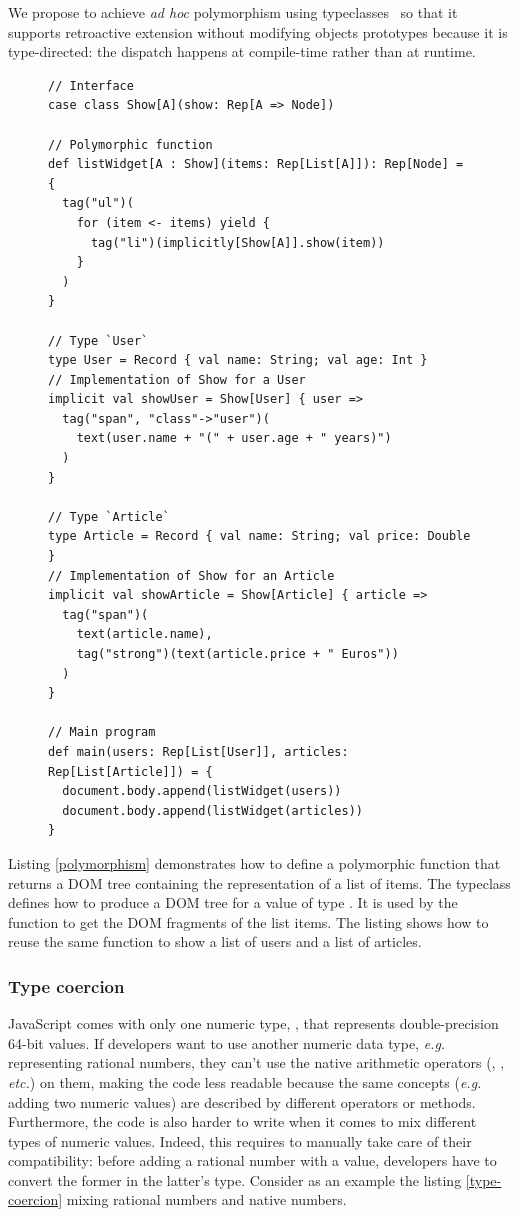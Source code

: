 \documentclass[american,english,runningheads]{llncs}
\newcommand{\eg}{\emph{e.g.}}
\newcommand{\etc}{\emph{etc.}}
\begin{document}
We propose to achieve \emph{ad hoc} polymorphism using
typeclasses~\cite{Wadler89_AdhocPolymorphism,Odersky06_Typeclasses,Oliveira10_Typeclasses} so that it supports
retroactive extension without modifying objects prototypes because it is type-directed: the dispatch happens at
compile-time rather than at runtime.

\begin{figure}
\begin{lstlisting}[label=polymorphism,caption=Ad hoc polymorphism using typeclasses]
// Interface
case class Show[A](show: Rep[A => Node])

// Polymorphic function
def listWidget[A : Show](items: Rep[List[A]]): Rep[Node] = {
  tag("ul")(
    for (item <- items) yield {
      tag("li")(implicitly[Show[A]].show(item))
    }
  )
}

// Type `User`
type User = Record { val name: String; val age: Int }
// Implementation of Show for a User
implicit val showUser = Show[User] { user =>
  tag("span", "class"->"user")(
    text(user.name + "(" + user.age + " years)")
  )
}

// Type `Article`
type Article = Record { val name: String; val price: Double }
// Implementation of Show for an Article
implicit val showArticle = Show[Article] { article =>
  tag("span")(
    text(article.name),
    tag("strong")(text(article.price + " Euros"))
  )
}

// Main program
def main(users: Rep[List[User]], articles: Rep[List[Article]]) = {
  document.body.append(listWidget(users))
  document.body.append(listWidget(articles))
}
\end{lstlisting}
\end{figure}

Listing \ref{polymorphism} demonstrates how to define a polymorphic  function that returns a DOM
tree containing the representation of a list of items. The  typeclass defines how to produce a DOM tree
for a value of type . It is used by the  function to get the DOM fragments of the list
items. The listing shows how to reuse the same  function to show a list of users and a list of
articles.

\subsubsection{Type coercion}

JavaScript comes with only one numeric type, , that represents double-precision 64-bit values. If
developers want to use another numeric data type, \eg{} representing rational numbers, they can’t use the native
arithmetic operators (\code{+}, \code{-}, \etc) on them, making the code less readable because the same concepts
(\eg{} adding two numeric values) are described by different operators or methods. Furthermore, the code is also
harder to write when it comes to mix different types of numeric values. Indeed, this requires to manually take care
of their compatibility: before adding a rational number with a  value, developers have to convert the
former in the latter’s type. Consider as an example the listing \ref{type-coercion} mixing rational numbers and
native numbers.
\end{document}
